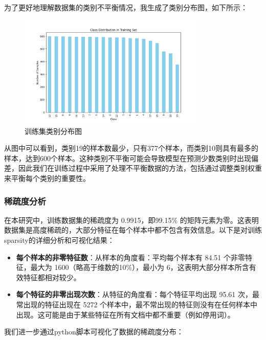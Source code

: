 \documentclass[11pt,a4paper]{article}
\begin{document}
为了更好地理解数据集的类别不平衡情况，我生成了类别分布图，如下所示：

\begin{figure}[htbp]
    \centering
    \includegraphics[width=0.8\textwidth]{../picture/class_distribution.png}
    \caption{训练集类别分布图}
    \label{fig:class_distribution}
\end{figure}

从图中可以看到，类别19的样本数最少，只有377个样本，而类别10则具有最多的样本，达到600个样本。这种类别不平衡可能会导致模型在预测少数类别时出现偏差，因此我们在训练过程中采用了处理不平衡数据的方法，包括通过调整类别权重来平衡每个类别的重要性。


\subsubsection{稀疏度分析}

在本研究中，训练数据集的稀疏度为 0.9915，即99.15\% 的矩阵元素为零。这表明数据集是高度稀疏的，大部分特征在每个样本中都不包含有效信息。以下是对训练sparsity的详细分析和可视化结果：

\begin{itemize}
    \item \textbf{每个样本的非零特征数}：从样本的角度看：平均每个样本有 84.51 个非零特征，最大为 1600（略高于维数的10\%），最小为 6，这表明大部分样本所含有效特征都相对较少。
    \item \textbf{每个特征的非零出现次数}：从特征的角度看：每个特征平均出现 95.61 次，最常出现的特征出现在 5272 个样本中，最不常出现的特征则没有在任何样本中出现。这可能是由于某些特征在所有文档中都不重要（例如停用词）。
\end{itemize}

我们进一步通过python脚本可视化了数据的稀疏度分布：
\end{document}

